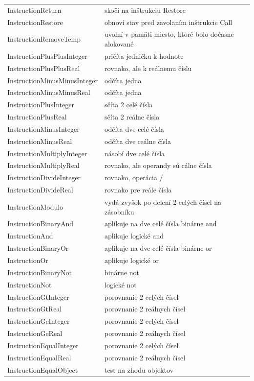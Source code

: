 \begin{center}
\begin{longtable}{|l|l|l|}
InstructionReturn& skočí na inštrukciu Restore\\
InstructionRestore& obnoví stav pred zavolaním inštrukcie Call\\
InstructionRemoveTemp& uvoľní v pamäti miesto, ktoré bolo dočasne alokované\\
InstructionPlusPlusInteger& pričíta jedničku k hodnote\\
InstructionPlusPlusReal& rovnako, ale k reálnemu číslu\\
InstructionMinusMinusInteger& odčíta jedna\\
InstructionMinusMinusReal& odčíta jedna\\
InstructionPlusInteger& sčíta 2 celé čísla\\
InstructionPlusReal& sčíta 2 reálne čísla\\
InstructionMinusInteger& odčíta dve celé čísla\\
InstructionMinusReal& odčíta dve reálne čísla\\
InstructionMultiplyInteger& násobí dve celé čísla\\
InstructionMultiplyReal& rovnako, ale operandy sú rálne čísla\\
InstructionDivideInteger& rovnako, operácia /\\
InstructionDivideReal& rovnako pre reále čísla\\
InstructionModulo& vydá zvyšok po delení 2 celých čísel na zásobníku\\
InstructionBinaryAnd& aplikuje na dve celé čísla binárne and\\
InstructionAnd& aplikuje logické and \\
InstructionBinaryOr&aplikuje na dve celé čísla binárne or\\
InstructionOr& aplikuje logické or\\
InstructionBinaryNot& binárne not\\
InstructionNot& logické not\\
InstructionGtInteger& porovnanie 2 celých čísel\\
InstructionGtReal&porovnanie 2 reálnych čísel\\
InstructionGeInteger&porovnanie 2 celých čísel\\
InstructionGeReal&porovnanie 2 reálnych čísel\\
InstructionEqualInteger&porovnanie 2 celých čísel\\
InstructionEqualReal&porovnanie 2 reálnych čísel\\
InstructionEqualObject&test na zhodu objektov\\

\end{longtable}
\end{center}
